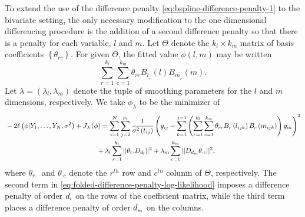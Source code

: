 To extend the use of the difference penalty \eqref{eq:bspline-difference-penalty-1} to the bivariate setting, the only necessary modification to the one-dimensional differencing procedure is the addition of a second difference penalty so that there is a penalty for each variable, $l$ and $m$. Let $\Theta$ denote the $k_l \times k_m$ matrix of basis coefficients $\left\{\theta_{rc}\right\}$. For given $\Theta$, the fitted value $\phi\left(l,m\right)$ may be written 
\[
\sum_{r=1}^{k_l} \sum_{c=1}^{k_m} \theta_{rc} {B_l}_{_{r}}\left(l\right){B_m}_{_{c}}\left(m\right).
\]
\noindent
Let $\lambda = \left(\lambda_l, \lambda_m\right)$ denote the tuple of smoothing parameters for the $l$ and $m$ dimensions, respectively. We take $\phi_\lambda$ to be the minimizer of 
\begin{align} 
\begin{split}\label{eq:folded-difference-penalty-log-likelihood}
&-2\ell\left(\phi \vert Y_1,\dots, Y_N, \sigma^2\right) + J_{\lambda}\left(\phi\right) = \sum_{i=1}^N \sum_{j=2}^{p_i} \frac{1}{\sigma^{2}\left({t_{ij}}\right)} \left(y_{ij} - \sum_{k=1}^{j-1} \left( \sum_{r=1}^{k_l} \sum_{c=1}^{k_m} \theta_{rc} B_r\left(l_{ijk}\right)B_c\left(m_{ijk}\right)\right)y_{ik} \right)^2 \\ 
&\phantom{{} - 2\ell\left(\phi \vert Y_1,\dots, Y_N\right) + J_{\lambda}\left(\phi\right) =  } + \lambda_l \sum_{r=1}^{k_l} \vert\vert \theta_{r \cdot}  D_{d_{\ms l}} \vert\vert^2 + \lambda_m \sum_{c=1}^{k_m}\vert \vert  D_{d_{\ms m}} \theta_{\cdot c} \vert\vert^2,
\end{split}
\end{align}
\noindent
where $\theta_{r \cdot}$ and $\theta_{\cdot c}$ denote the $r^{th}$ row and $c^{th}$ column of $\Theta$, respectively. The second term in \eqref{eq:folded-difference-penalty-log-likelihood} imposes a difference penalty of order $d_{\scriptscriptstyle l}$ on the rows of the coefficient matrix, while the third term places a difference penalty of order $d_{\scriptscriptstyle m}$ on the columns. 

\bigskip

